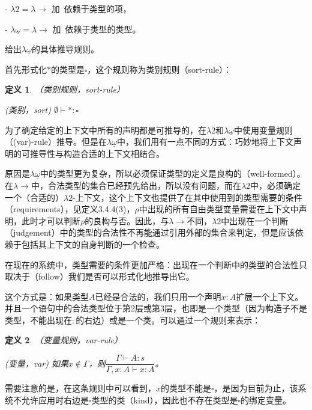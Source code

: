 \documentclass[UTF8]{article}
\newtheorem{thm}{定义}[section]
\begin{document}
		\noindent
		- $\lambda{2} = \lambda{\rightarrow}$ 加\ 依赖于类型的项，
		
		\noindent
		- $\lambda{\underline{\omega}} = \lambda{\rightarrow}$ 加\ 依赖于类型的类型。
		
		给出$\lambda{\underline{\omega}}$的具体推导规则。
		
		首先形式化$*$的类型是$\square$，这个规则称为类别规则（sort-rule）：
		
		\begin{thm} （类别规则，sort-rule）
			
			(类别，sort) $\emptyset \vdash *:\square$
		\end{thm}
	
		为了确定给定的上下文中所有的声明都是可推导的，在$\lambda{2}$和$\lambda{\underline{\omega}}$中使用变量规则（(var)-rule）推导。但是在$\lambda{\underline{\omega}}$中，我们用有一点不同的方式：巧妙地将上下文声明的可推导性与构造合适的上下文相结合。
		
		原因是$\lambda{\underline{\omega}}$中的类型更为复杂，所以必须保证类型的定义是良构的（well-formed）。在$\lambda{\rightarrow}$中，合法类型的集合已经预先给出，所以没有问题，而在$\lambda{2}$中，必须确定一个（合适的）$\lambda{2}$-上下文，这个上下文也提供了在其中使用到的类型需要的条件（requirements），见定义3.4.4(3)，$\rho$中出现的所有自由类型变量需要在上下文中声明，此时才可以判断$\rho$的良构与否。因此，与$\lambda{\rightarrow}$不同，$\lambda{2}$中出现在一个判断（judgement）中的类型的合法性不再能通过引用外部的集合来判定，但是应该依赖于包括其上下文的自身判断的一个检查。
		
		在现在的系统中，类型需要的条件更加严格：出现在一个判断中的类型的合法性只取决于（follow）我们是否可以形式化地推导出它。
		
		这个方式是：如果类型$A$已经是合法的，我们只用一个声明$x:A$扩展一个上下文。并且一个语句中的合法类型位于第2层或第3层，也即是一个类型（因为构造子不是类型，不能出现在$:$的右边）或是一个类。可以通过一个规则来表示：
		
		\begin{thm}（变量规则，var-rule）
			
			(变量，var) 如果$x\not\in\Gamma$，则$\dfrac{\Gamma\vdash A:s}{\Gamma,x:A\vdash x:A}$。
		\end{thm}
		
		需要注意的是，在这条规则中可以看到，$x$的类型不能是$\square$，是因为目前为止，该系统不允许应用时右边是$\square$类型的类（kind），因此也不存在类型是$\square$的绑定变量。
\end{document}
